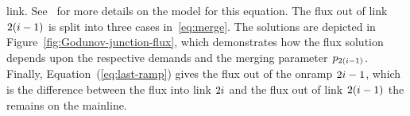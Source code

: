 			link. See~\cite{Monache2013} for more details on the model for this
			equation. The flux out of link $2(i-1)$ is split into three cases
			in~\eqref{eq:merge}. The solutions are depicted in Figure~\ref{fig:Godunov-junction-flux},
			which demonstrates how the flux solution depends upon the respective
			demands and the merging parameter $p_{2\left(\link-1\right)}$. Finally,
			Equation~(\eqref{eq:last-ramp}) gives the flux out of the onramp $2i-1$,
			which is the difference between the flux into link $2i$ and the
			flux out of link $2\left(\link-1\right)$ the remains on the mainline.
			\begin{figure}
				\hfill{}\hfill{}
																

\end{figure}
